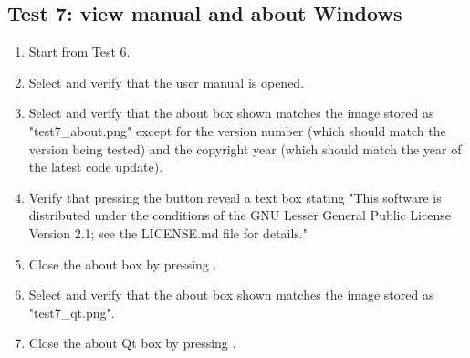 \subsection{Test 7: view manual and about Windows}
\begin{enumerate}
\item Start from Test 6.
\item Select  \textrightarrow {} and verify that the user manual is opened.
\item Select  \textrightarrow {} and verify that the about box shown matches the image stored as "test7\_about.png" except for the version number (which should match the version being tested) and the copyright year (which should match the year of the latest code update).
\item Verify that pressing the  button reveal a text box stating "This software is distributed under the conditions of the GNU Lesser General Public License Version 2.1; see the LICENSE.md file for details."
\item Close the about box by pressing .
\item Select  \textrightarrow {} and verify that the about box shown matches the image stored as "test7\_qt.png".
\item Close the about Qt box by pressing .
\end{enumerate}

